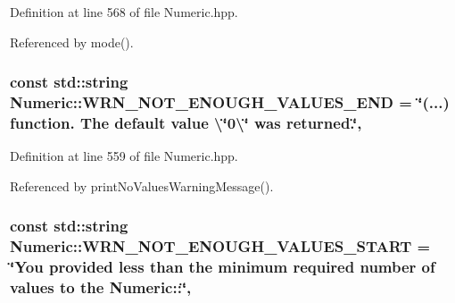 Definition at line 568 of file Numeric.\-hpp.



Referenced by mode().

\hypertarget{classmultiscale_1_1Numeric_a735efee33b8687c010a03cb1e5e9589c}{
\subsubsection[{W\-R\-N\-\_\-\-N\-O\-T\-\_\-\-E\-N\-O\-U\-G\-H\-\_\-\-V\-A\-L\-U\-E\-S\-\_\-\-E\-N\-D}]{\setlength{\rightskip}{0pt plus 5cm}const std\-::string Numeric\-::\-W\-R\-N\-\_\-\-N\-O\-T\-\_\-\-E\-N\-O\-U\-G\-H\-\_\-\-V\-A\-L\-U\-E\-S\-\_\-\-E\-N\-D = \char`\"{}(...) function. The default value \textbackslash{}\char`\"{}0\textbackslash{}\char`\"{} was returned.\char`\"{}\hspace{0.3cm}{\ttfamily [static]}, {\ttfamily [private]}}}\label{classmultiscale_1_1Numeric_a735efee33b8687c010a03cb1e5e9589c}


Definition at line 559 of file Numeric.\-hpp.



Referenced by print\-No\-Values\-Warning\-Message().

\hypertarget{classmultiscale_1_1Numeric_ab78e644d069f448030e24fecb7c4c8d9}{
\subsubsection[{W\-R\-N\-\_\-\-N\-O\-T\-\_\-\-E\-N\-O\-U\-G\-H\-\_\-\-V\-A\-L\-U\-E\-S\-\_\-\-S\-T\-A\-R\-T}]{\setlength{\rightskip}{0pt plus 5cm}const std\-::string Numeric\-::\-W\-R\-N\-\_\-\-N\-O\-T\-\_\-\-E\-N\-O\-U\-G\-H\-\_\-\-V\-A\-L\-U\-E\-S\-\_\-\-S\-T\-A\-R\-T = \char`\"{}You provided less than the {\bf minimum} required number of values to the Numeric\-::\char`\"{}\hspace{0.3cm}{\ttfamily [static]}, {\ttfamily [private]}}}\label{classmultiscale_1_1Numeric_ab78e644d069f448030e24fecb7c4c8d9}


